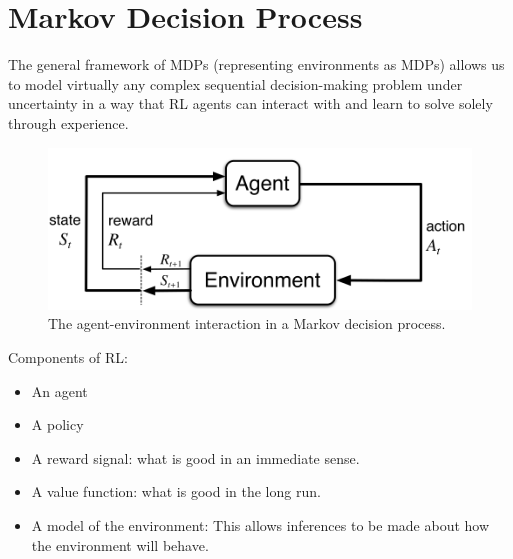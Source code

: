 \chapter{Markov Decision Process}

The general framework of MDPs (representing environments as MDPs) allows us to model virtually any complex sequential decision-making problem under uncertainty in a way that RL agents can interact with and learn to solve solely through experience. 

\begin{figure}[h]
	\centering
	\includegraphics[scale=0.3]{./images/mdp.png}
	\caption{The agent-environment interaction in a Markov decision process.}
	\label{fig:mdp_ill}
\end{figure}


Components of RL:
\begin{itemize}
	\item An agent
	\item A policy
	\item A reward signal: what is good in an immediate sense.
	\item A value function: what is good in the long run.
	\item A model of the environment: This allows inferences to be made about how the environment will behave.
\end{itemize}


